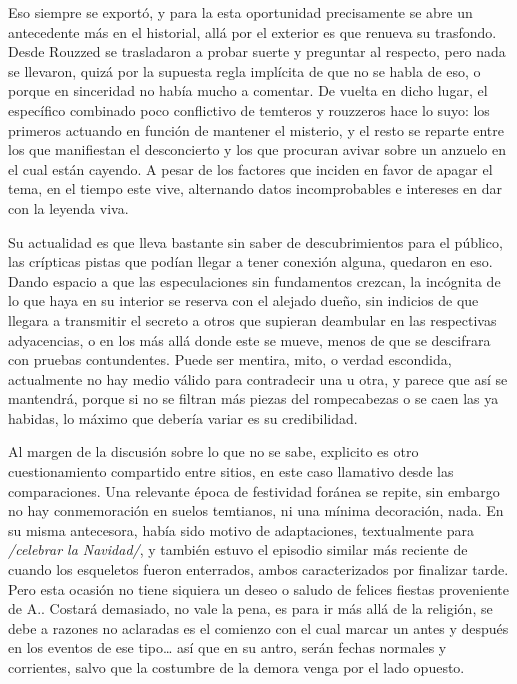 \documentclass[
  spanish,
]{book}
\begin{document}
Eso siempre se exportó, y para la esta oportunidad precisamente se abre un antecedente más en el historial, allá por el exterior es que renueva su trasfondo. Desde Rouzzed se trasladaron a probar suerte y preguntar al respecto, pero nada se llevaron, quizá por la supuesta regla implícita de que no se habla de eso, o porque en sinceridad no había mucho a comentar. De vuelta en dicho lugar, el específico combinado poco conflictivo de temteros y rouzzeros hace lo suyo: los primeros actuando en función de mantener el misterio, y el resto se reparte entre los que manifiestan el desconcierto y los que procuran avivar sobre un anzuelo en el cual están cayendo. A pesar de los factores que inciden en favor de apagar el tema, en el tiempo este vive, alternando datos incomprobables e intereses en dar con la leyenda viva.

Su actualidad es que lleva bastante sin saber de descubrimientos para el público, las crípticas pistas que podían llegar a tener conexión alguna, quedaron en eso. Dando espacio a que las especulaciones sin fundamentos crezcan, la incógnita de lo que haya en su interior se reserva con el alejado dueño, sin indicios de que llegara a transmitir el secreto a otros que supieran deambular en las respectivas adyacencias, o en los más allá donde este se mueve, menos de que se descifrara con pruebas contundentes. Puede ser mentira, mito, o verdad escondida, actualmente no hay medio válido para contradecir una u otra, y parece que así se mantendrá, porque si no se filtran más piezas del rompecabezas o se caen las ya habidas, lo máximo que debería variar es su credibilidad.

Al margen de la discusión sobre lo que no se sabe, explicito es otro cuestionamiento compartido entre sitios, en este caso llamativo desde las comparaciones. Una relevante época de festividad foránea se repite, sin embargo no hay conmemoración en suelos temtianos, ni una mínima decoración, nada. En su misma antecesora, había sido motivo de adaptaciones, textualmente para \emph{/celebrar la Navidad/}, y también estuvo el episodio similar más reciente de cuando los esqueletos fueron enterrados, ambos caracterizados por finalizar tarde. Pero esta ocasión no tiene siquiera un deseo o saludo de felices fiestas proveniente de A.. Costará demasiado, no vale la pena, es para ir más allá de la religión, se debe a razones no aclaradas es el comienzo con el cual marcar un antes y después en los eventos de ese tipo\ldots{} así que en su antro, serán fechas normales y corrientes, salvo que la costumbre de la demora venga por el lado opuesto.
\end{document}
